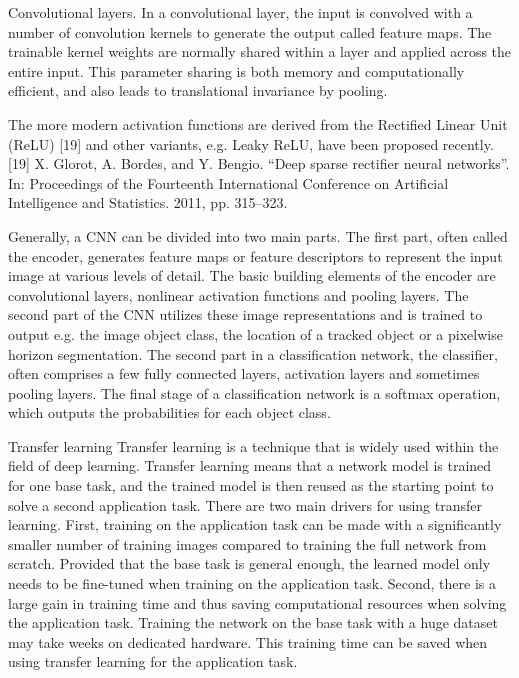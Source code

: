 \documentclass[a4paper]{report}
\begin{document}
Convolutional layers. In a convolutional layer, the input is convolved with a number of convolution kernels to generate the output called feature maps. The trainable kernel weights are normally shared within a layer and applied across the entire input. This parameter sharing is both memory and computationally efficient, and also leads to translational invariance by pooling.

The more modern activation functions are derived from the Rectified Linear Unit (ReLU) [19] and other variants, e.g. Leaky ReLU, have been proposed recently.
[19] X. Glorot, A. Bordes, and Y. Bengio. “Deep sparse rectifier neural networks”.
In: Proceedings of the Fourteenth International Conference on
Artificial Intelligence and Statistics. 2011, pp. 315–323.


Generally, a CNN can be divided into two main parts. The first part, often
called the encoder, generates feature maps or feature descriptors to represent
the input image at various levels of detail. The basic building elements of the
encoder are convolutional layers, nonlinear activation functions and pooling
layers. The second part of the CNN utilizes these image representations and is
trained to output e.g. the image object class, the location of a tracked object or
a pixelwise horizon segmentation. The second part in a classification network,
the classifier, often comprises a few fully connected layers, activation layers
and sometimes pooling layers. The final stage of a classification network is a
softmax operation, which outputs the probabilities for each object class.


Transfer learning
Transfer learning is a technique that is widely used within the field of deep learning. Transfer learning means that a network model is trained for one
base task, and the trained model is then reused as the starting point to solve
a second application task. There are two main drivers for using transfer learning.
First, training on the application task can be made with a significantly
smaller number of training images compared to training the full network from
scratch. Provided that the base task is general enough, the learned model only
needs to be fine-tuned when training on the application task. Second, there
is a large gain in training time and thus saving computational resources when
solving the application task. Training the network on the base task with a
huge dataset may take weeks on dedicated hardware. This training time can
be saved when using transfer learning for the application task.
\end{document}
